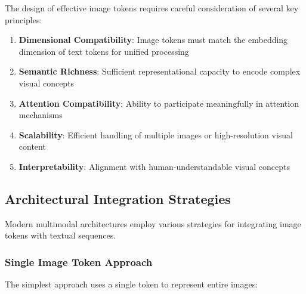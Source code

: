 The design of effective image tokens requires careful consideration of several key principles:

\begin{enumerate}
\item \textbf{Dimensional Compatibility}: Image tokens must match the embedding dimension of text tokens for unified processing
\item \textbf{Semantic Richness}: Sufficient representational capacity to encode complex visual concepts
\item \textbf{Attention Compatibility}: Ability to participate meaningfully in attention mechanisms
\item \textbf{Scalability}: Efficient handling of multiple images or high-resolution visual content
\item \textbf{Interpretability}: Alignment with human-understandable visual concepts
\end{enumerate}

\subsection{Architectural Integration Strategies}

Modern multimodal architectures employ various strategies for integrating image tokens with textual sequences.

\subsubsection{Single Image Token Approach}

The simplest approach uses a single token to represent entire images:

